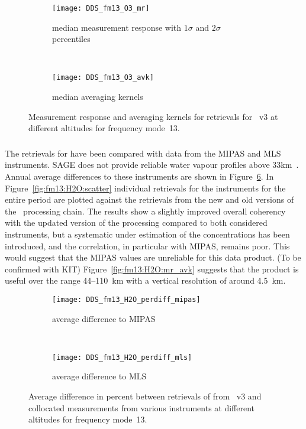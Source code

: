 \begin{figure}[tbhp]
    \centering
    \begin{subfigure}[b]{0.49\textwidth}
        \texttt{[image: DDS\_fm13\_O3\_mr]}
        \caption{median measurement response with $1\sigma$ and $2\sigma$
        percentiles}
        \label{fig:fm13:O3:mr}
    \end{subfigure}
    \,
    \begin{subfigure}[b]{0.49\textwidth}
        \texttt{[image: DDS\_fm13\_O3\_avk]}
        \caption{median averaging kernels\newline~}
        \label{fig:fm13:O3:avk}
    \end{subfigure}
    \caption{Measurement response and averaging kernels for 
    retrievals for \smr~v3 at different altitudes for frequency mode~13.}
    \label{fig:fm13:O3:mr_avk}
\end{figure}



\subsubsection{}
\label{sec:fm13:comparison:H2O}
The retrievals for  have been compared with data from the MIPAS and
MLS instruments. SAGE does not provide reliable water vapour profiles above
33km~\cite{VDS:2016}. Annual average differences to these instruments are
shown in Figure~\ref{fig:fm13:H2O:profiles}. In
Figure~\ref{fig:fm13:H2O:scatter} individual retrievals for the instruments for
the entire period are plotted against the retrievals from the new and old
versions of the \smr\ processing chain. The results show a slightly improved
overall coherency with the updated version of the processing compared to both
considered instruments, but a systematic under estimation of the concentrations
has been introduced, and the correlation, in particular with MIPAS, remains
poor.  This would suggest that the MIPAS values are  unreliable for this data
product. (To be confirmed with KIT) Figure~\ref{fig:fm13:H2O:mr_avk} suggests
that the product is useful over the range 44--110~km with a vertical resolution
of around 4.5~km.


\begin{figure}[tbhp]
    \centering
    \begin{subfigure}[b]{0.49\textwidth}
        \texttt{[image: DDS\_fm13\_H2O\_perdiff\_mipas]}
        \caption{average difference to MIPAS}
        \label{fig:fm13:H2O:profiles:MIPAS}
    \end{subfigure}
    \,
    \begin{subfigure}[b]{0.49\textwidth}
        \texttt{[image: DDS\_fm13\_H2O\_perdiff\_mls]}
        \caption{average difference to MLS}
        \label{fig:fm13:H2O:profiles:MLS}
    \end{subfigure}
    \caption{Average difference in percent between retrievals of 
    from \smr~v3 and collocated measurements from various instruments at
    different altitudes for frequency mode~13.}

    \label{fig:fm13:H2O:profiles}
\end{figure}

